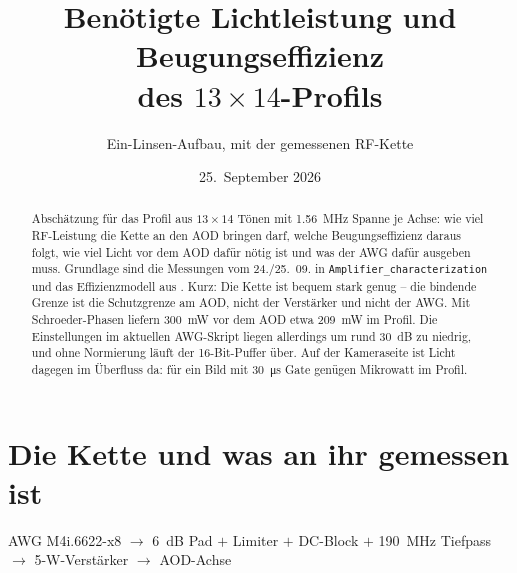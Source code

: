 \documentclass[11pt,a4paper]{article}
\title{Benötigte Lichtleistung und Beugungseffizienz\\ des $13\times14$-Profils}
\author{Ein-Linsen-Aufbau, mit der gemessenen RF-Kette}
\date{25.~September 2026}
\begin{document}
\maketitle

\begin{abstract}
\noindent
Abschätzung für das Profil aus $13\times14$ Tönen mit \SI{1,56}{\mega\hertz}
Spanne je Achse: wie viel RF-Leistung die Kette an den AOD bringen darf, welche
Beugungseffizienz daraus folgt, wie viel Licht vor dem AOD dafür nötig ist und
was der AWG dafür ausgeben muss. Grundlage sind die Messungen vom 24./25.~09.
in \texttt{Amplifier\_characterization} und das Effizienzmodell aus
\cite{beugung}. Kurz: Die Kette ist bequem stark genug -- die bindende Grenze
ist die Schutzgrenze am AOD, nicht der Verstärker und nicht der AWG. Mit
Schroeder-Phasen liefern \SI{300}{\milli\watt} vor dem AOD etwa
\SI{209}{\milli\watt} im Profil. Die Einstellungen im aktuellen AWG-Skript
liegen allerdings um rund \SI{30}{\deci\bel} zu niedrig, und ohne Normierung
läuft der 16-Bit-Puffer über. Auf der Kameraseite ist Licht dagegen im Überfluss da: für ein Bild mit \SI{30}{\micro\second} Gate genügen Mikrowatt im Profil.
\end{abstract}

\section{Die Kette und was an ihr gemessen ist}

\begin{center}\small
AWG M4i.6622-x8 $\longrightarrow$
\SI{6}{\deci\bel} Pad $+$ Limiter $+$ DC-Block $+$ \SI{190}{\mega\hertz} Tiefpass\\[2pt]
$\longrightarrow$ 5-W-Verstärker $\longrightarrow$ AOD-Achse
\end{center}
\end{document}

